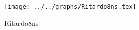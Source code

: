 \begin{figure}[h] \centering \texttt{[image: ../../graphs/Ritardo8ns.tex]}\caption{Ritardo8ns}\label{gr:Ritardo8ns} \end{figure}

